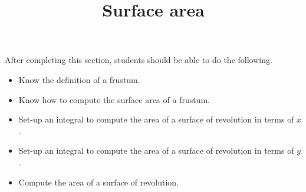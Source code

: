 \documentclass{ximera}
\title{Surface area}
\begin{document}
\begin{abstract}
\end{abstract}

\maketitle

\begin{sectionOutcomes}

After completing this section, students should be able to do the following.

\begin{itemize}
\item Know the definition of a frustum.
\item Know how to compute the surface area of a frustum.
\item Set-up an integral to compute the area of a surface of revolution in terms of $x$.
\item Set-up an integral to compute the area of a surface of revolution in terms of $y$.
\item Compute the area of a surface of revolution. 
\end{itemize}

\end{sectionOutcomes}
\end{document}
